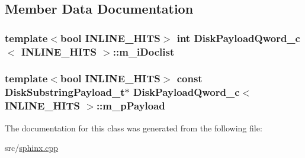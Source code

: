 \subsection{Member Data Documentation}
\hypertarget{classDiskPayloadQword__c_a3e176b09cf7cc8d380a1b0c5daaa5fe8}{
\subsubsection[{m\-\_\-i\-Doclist}]{\setlength{\rightskip}{0pt plus 5cm}template$<$bool I\-N\-L\-I\-N\-E\-\_\-\-H\-I\-T\-S$>$ {\bf int} {\bf Disk\-Payload\-Qword\-\_\-c}$<$ I\-N\-L\-I\-N\-E\-\_\-\-H\-I\-T\-S $>$\-::m\-\_\-i\-Doclist\hspace{0.3cm}{\ttfamily [private]}}}\label{classDiskPayloadQword__c_a3e176b09cf7cc8d380a1b0c5daaa5fe8}
\hypertarget{classDiskPayloadQword__c_ac15bc32720d8ba52bea6b16376c605c4}{
\subsubsection[{m\-\_\-p\-Payload}]{\setlength{\rightskip}{0pt plus 5cm}template$<$bool I\-N\-L\-I\-N\-E\-\_\-\-H\-I\-T\-S$>$ const {\bf Disk\-Substring\-Payload\-\_\-t}$\ast$ {\bf Disk\-Payload\-Qword\-\_\-c}$<$ I\-N\-L\-I\-N\-E\-\_\-\-H\-I\-T\-S $>$\-::m\-\_\-p\-Payload\hspace{0.3cm}{\ttfamily [private]}}}\label{classDiskPayloadQword__c_ac15bc32720d8ba52bea6b16376c605c4}


The documentation for this class was generated from the following file\-:\begin{DoxyCompactItemize}
\item 
src/\hyperlink{sphinx_8cpp}{sphinx.\-cpp}\end{DoxyCompactItemize}
